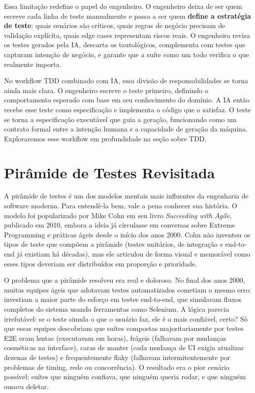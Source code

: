 Essa limitação redefine o papel do engenheiro. O engenheiro deixa de ser quem
escreve cada linha de teste manualmente e passa a ser quem \textbf{define a
estratégia de teste}: quais cenários são críticos, quais regras de negócio
precisam de validação explícita, quais edge cases representam riscos reais.
O engenheiro revisa os testes gerados pela IA, descarta os tautológicos,
complementa com testes que capturam intenção de negócio, e garante que a
suíte como um todo verifica o que realmente importa.

No workflow TDD combinado com IA, essa divisão de responsabilidades se torna
ainda mais clara. O engenheiro escreve o teste primeiro, definindo o
comportamento esperado com base em seu conhecimento do domínio. A IA então
recebe esse teste como especificação e implementa o código que o satisfaz. O
teste se torna a especificação executável que guia a geração, funcionando como
um contrato formal entre a intenção humana e a capacidade de geração da
máquina. Exploraremos esse workflow em profundidade na seção sobre TDD.

\section{Pirâmide de Testes Revisitada}

A pirâmide de testes é um dos modelos mentais mais influentes da engenharia de
software moderna. Para entendê-la bem, vale a pena conhecer sua
história. O modelo foi popularizado por Mike Cohn em seu livro \textit{Succeeding
with Agile}, publicado em 2010, embora a ideia já circulasse em conversas sobre
Extreme Programming e práticas ágeis desde o início dos anos 2000. Cohn não
inventou os tipos de teste que compõem a pirâmide (testes unitários, de
integração e end-to-end já existiam há décadas), mas ele articulou de forma
visual e memorável como esses tipos deveriam ser distribuídos em proporção e
prioridade.

O problema que a pirâmide resolveu era real e doloroso. No final dos anos 2000,
muitas equipes ágeis que adotavam testes automatizados cometiam o mesmo erro:
investiam a maior parte do esforço em testes end-to-end, que simulavam fluxos
completos do sistema usando ferramentas como Selenium. A lógica parecia
irrefutável: se o teste simula o que o usuário faz, ele é o mais confiável,
certo? Só que essas equipes descobriam que suítes compostas majoritariamente
por testes E2E eram lentas (executavam em horas), frágeis (falhavam por mudanças
cosméticas na interface), caras de manter (cada mudança de UI exigia atualizar
dezenas de testes) e frequentemente flaky (falhavam intermitentemente por
problemas de timing, rede ou concorrência). O resultado era o pior cenário
possível: suítes que ninguém confiava, que ninguém queria rodar, e que ninguém
ousava deletar.

